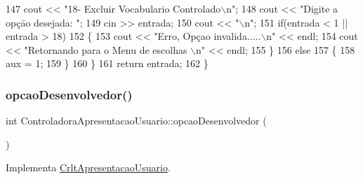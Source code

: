 \begin{DoxyCode}
147       cout << \textcolor{stringliteral}{"18- Excluir Vocabulario Controlado\(\backslash\)n"};
148       cout << \textcolor{stringliteral}{"Digite a opçāo desejada: "};
149       cin >> entrada;
150       cout << \textcolor{stringliteral}{"\(\backslash\)n"};
151       \textcolor{keywordflow}{if}(entrada < 1 || entrada > 18)
152       \{
153         cout << \textcolor{stringliteral}{"Erro, Opçao invalida.....\(\backslash\)n"} << endl;
154         cout << \textcolor{stringliteral}{"Retornando para o Menu de escolhas \(\backslash\)n"} << endl;
155       \}
156       \textcolor{keywordflow}{else}
157       \{
158         aux = 1;
159       \}
160   \}
161   \textcolor{keywordflow}{return} entrada;
162 \}
\end{DoxyCode}
\mbox{\label{class_controladora_apresentacao_usuario_a1d9f2e8522d9e0eefaf08caca98008c2}} 
\subsubsection{\texorpdfstring{opcao\+Desenvolvedor()}{opcaoDesenvolvedor()}}
{\footnotesize\ttfamily int Controladora\+Apresentacao\+Usuario\+::opcao\+Desenvolvedor (\begin{DoxyParamCaption}{ }\end{DoxyParamCaption})\hspace{0.3cm}{\ttfamily [virtual]}}



Implementa \mbox{\hyperlink{class_crlt_apresentacao_usuario_ad9091cb4093bdc687c0deffb5b00512c}{Crlt\+Apresentacao\+Usuario}}.


